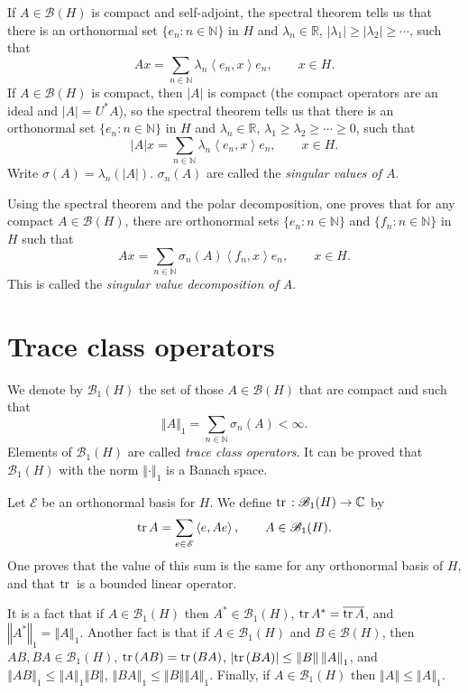 \documentclass{article}
\newcommand{\inner}[2]{\left\langle #1, #2 \right\rangle}
\newcommand{\tr}{\ensuremath\mathrm{tr}\,}
\newcommand{\norm}[1]{\left\Vert #1 \right\Vert}
\theoremstyle{definition}
\begin{document}
If $A \in \mathscr{B}(H)$ is compact and self-adjoint, the spectral theorem tells us that there is an orthonormal set $\{e_n: n \in \mathbb{N}\}$
in $H$ and $\lambda_n \in \mathbb{R}$, $|\lambda_1| \geq |\lambda_2| \geq \cdots$, such that 
\[
Ax = \sum_{n \in \mathbb{N}} \lambda_n \inner{e_n}{x}e_n, \qquad x \in H.
\]
If $A \in \mathscr{B}(H)$ is compact, then $|A|$ is compact (the compact operators are an ideal and $|A|=U^*A$), so the spectral theorem tells us that there is an orthonormal set
$\{e_n: n \in \mathbb{N}\}$ in $H$ and $\lambda_n \in \mathbb{R}$, $\lambda_1 \geq \lambda_2 \geq \cdots \geq 0$, such that
\[
|A|x = \sum_{n \in \mathbb{N}} \lambda_n \inner{e_n}{x}e_n, \qquad x\in H.
\]
Write $\sigma(A)=\lambda_n(|A|)$. $\sigma_n(A)$ are called the {\em singular values of $A$}.

Using the spectral theorem and the polar decomposition, one proves that for any compact $A \in \mathscr{B}(H)$, there are orthonormal
sets $\{e_n: n \in \mathbb{N}\}$ and $\{f_n: n \in \mathbb{N}\}$ in $H$ such that
\[
Ax = \sum_{n \in \mathbb{N}} \sigma_n(A) \inner{f_n}{x}e_n, \qquad x \in H.
\]
This is called the {\em singular value decomposition of $A$}. 


\section{Trace class operators}
We denote by $\mathscr{B}_1(H)$ the set of those  $A \in \mathscr{B}(H)$ that are compact and such that
\[
\norm{A}_1 = \sum_{n \in \mathbb{N}} \sigma_n(A) < \infty.
\]
Elements of $\mathscr{B}_1(H)$ are called {\em trace class operators}.
It can be proved that 
$\mathscr{B}_1(H)$ with the norm $\norm{\cdot}_1$ is a Banach space. 

Let $\mathscr{E}$ be an orthonormal basis for $H$.
We define $\tr: \mathscr{B}_1(H) \to \mathbb{C}$ by
\[
\tr A = \sum_{e \in \mathscr{E}} \inner{e}{Ae}, \qquad A \in \mathscr{B}_1(H).
\]
One proves that the value of this sum is the same for any orthonormal basis of $H$, and that $\tr$ is a bounded linear operator.

It is a fact that if $A \in \mathscr{B}_1(H)$ then $A^* \in \mathscr{B}_1(H)$, $\tr A^* = \overline{\tr A}$, and $\norm{A^*}_1 =\norm{A}_1$. Another fact is that
if $A \in \mathscr{B}_1(H)$ and $B \in \mathscr{B}(H)$, then $AB,BA \in \mathscr{B}_1(H)$, $\tr(AB)=\tr(BA)$,  $|\tr(BA)| \leq 
\norm{B}\norm{A}_1$, and $\norm{AB}_1 \leq \norm{A}_1 \norm{B}$, $\norm{BA}_1 \leq \norm{B}\norm{A}_1$.  Finally,
if $A \in \mathscr{B}_1(H)$ then $\norm{A} \leq \norm{A}_1$. 
\end{document}
